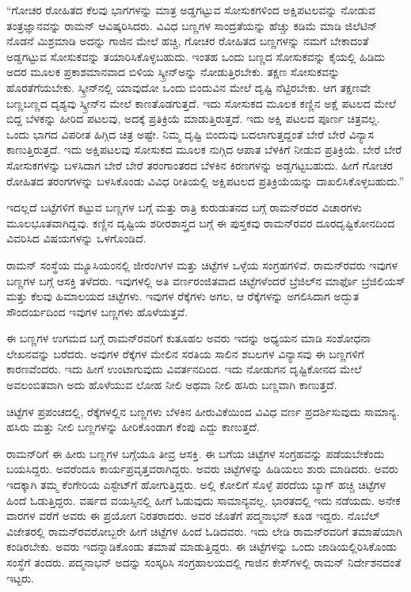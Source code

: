 “ಗೋಚರ ರೋಹಿತದ ಕೆಲವು ಭಾಗಗಳನ್ನು ಮಾತ್ರ ಅಡ್ಡಗಟ್ಟುವ ಸೋಸುಕಗಳಿಂದ ಅಕ್ಷಿಪಟಲವನ್ನು ನೋಡುವ ತಂತ್ರಜ್ಞಾನವನ್ನು ರಾಮನ್ ಆವಿಷ್ಕರಿಸಿದರು. ವಿವಿಧ ಬಣ್ಣಗಳ ಸಾಂದ್ರತೆಯನ್ನು ಹೆಚ್ಚು ಕಡಿಮೆ ಮಾಡಿ ಜಿಲೆಟಿನ್ ನೊಡನೆ ಮಿಶ್ರಮಾಡಿ ಅದನ್ನು ಗಾಜಿನ ಮೇಲೆ ಹಚ್ಚಿ, ಗೋಚರ ರೋಹಿತದ ಬಣ್ಣಗಳನ್ನು ನಮಗೆ ಬೇಕಾದಂತೆ ಅಡ್ಡಗಟ್ಟುವ ಸೋಸುಕವನ್ನು ತಯಾರಿಸಿಕೊಳ್ಳಬಹುದು. ಇಂತಹ ಒಂದು ಬಣ್ಣದ ಸೋಸುಕವನ್ನು ಕೈಯಲ್ಲಿ ಹಿಡಿದು ಅದರ ಮೂಲಕ ಪ್ರಕಾಶಮಾನವಾದ ಬಿಳಿಯ ಸ್ಕ್ರೀನ್‍ಅನ್ನು ನೋಡುತ್ತಿರಬೇಕು. ತಕ್ಷಣ ಸೋಸುಕವನ್ನು ಹೊರತೆಗೆಯಬೇಕು. ಸ್ಕ್ರೀನ್‍ನಲ್ಲಿ ಯಾವುದೋ ಒಂದು ಬಿಂದುವಿನ ಮೇಲೆ ದೃಷ್ಟಿ ನೆಟ್ಟಿರಬೇಕು. ಆಗ ತಕ್ಷಣವೇ ಬಣ್ಣಬಣ್ಣದ ದೃಶ್ಯವು ಸ್ಕ್ರೀನ್‍ನ ಮೇಲೆ ಕಾಣತೊಡಗುತ್ತದೆ. ಇದು ಸೋಸುಕದ ಮೂಲಕ ಕಣ್ಣಿನ ಅಕ್ಷೆ ಪಟಲದ ಮೇಲೆ ಬಿದ್ದ ಬೆಳಕನ್ನು ಹೀರಿದ ಪಟಲವು, ಅದಕ್ಕೆ ಪ್ರತಿಕ್ರಿಯೆ ಮಾಡುತ್ತಿರುತ್ತದೆ. ಇದು ಅಕ್ಷಿ ಪಟಲದ ಪೂರ್ಣ ಚಿತ್ರವಲ್ಲ. ಒಂದು ಭಾಗದ ವಿಪರೀತ ಹಿಗ್ಗಿದ ಚಿತ್ರ ಅಷ್ಟೇ. ನಿಮ್ಮ ದೃಷ್ಟಿ ಬಿಂದುವು ಬದಲಾಗುತ್ತದ್ದಂತೆ ಬೇರೆ ಬೇರೆ ವಿನ್ಯಾಸ ಕಾಣುತ್ತಿರುತ್ತದೆ. ಇದು ಅಕ್ಷಿಪಟಲವು ಸೋಸುಕದ ಮೂಲಕ ನುಗ್ಗಿದ ಆಪಾತ ಬೆಳಕಿಗೆ ನೀಡುವ ಪ್ರತಿಕ್ರಿಯೆ. ಬೇರೆ ಬೇರೆ ಸೋಸುಕಗಳನ್ನು ಬಳಸಿದಾಗ ಬೇರೆ ಬೇರೆ ತರಂಗಾಂತರದ ಬೆಳಕಿನ ಕಿರಣಗಳನ್ನು ಅಡ್ಡಗಟ್ಟಬಹುದು. ಹೀಗೆ ಗೋಚರ ರೋಹಿತದ ತರಂಗಗಳನ್ನು ಬಳಸಿಕೊಂಡು ವಿವಿಧ ರೀತಿಯಲ್ಲಿ ಅಕ್ಷಿಪಟಲದ ಪ್ರತಿಕ್ರಿಯೆಯನ್ನು ದಾಖಲಿಸಿಕೊಳ್ಳಬಹುದು.”

ಇದಲ್ಲದೆ ಬಟ್ಟೆಗಳಿಗೆ ಕಟ್ಟುವ ಬಣ್ಣಗಳ ಬಗ್ಗೆ ಮತ್ತು ರಾತ್ರಿ ಕುರುಡುತನದ ಬಗ್ಗೆ ರಾಮನ್‍ರವರ ವಿಚಾರಗಳು ಮೂಲಭೂತವಾಗಿದ್ದವು. ಕಣ್ಣಿನ ದೃಷ್ಟಿಯ ಶರೀರಶಾಸ್ತ್ರದ ಬಗ್ಗೆ ಈ ಪುಸ್ತಕವು ರಾಮನ್‍ರವರ ದೂರದೃಷ್ಟಿಕೋನದಿಂದ ವಿವರಿಸಿದ ವಿಷಯಗಳನ್ನು ಒಳಗೊಂಡಿದೆ.



ರಾಮನ್ ಸಂಸ್ಥೆಯ ಮ್ಯೂಸಿಯಂನಲ್ಲಿ ಜೀರಂಗಿಗಳ ಮತ್ತು ಚಿಟ್ಟೆಗಳ ಒಳ್ಳೆಯ ಸಂಗ್ರಹಗಳಿವೆ. ರಾಮನ್‍ರವರು ಇವುಗಳ ಬಣ್ಣಗಳ ಬಗ್ಗೆ ಆಸಕ್ತಿ ತಳೆದರು. ಇವುಗಳಲ್ಲಿ ಅತಿ ವರ್ಣರಂಜಿತವಾದ ಚಿಟ್ಟೆಗಳೆಂದರೆ ಬ್ರೆಜಿಲ್‍ನ ಮಾರ್ಫೊ ಬ್ರೆಜಿಲಿಯಸ್ ಮತ್ತು ಕೆಲವು ಹಿಮಾಲಯದ ಚಿಟ್ಟೆಗಳು. ಇವುಗಳ ರೆಕ್ಕೆಗಳು ಅಗಲ, ಆ ರೆಕ್ಕೆಗಳನ್ನು ಅಗಲಿಸಿದಾಗ ಅದ್ಭುತ ಸೌಂದರ್ಯದಿಂದ ಇವುಗಳ ಬಣ್ಣಗಳು ಹೊಳೆಯತ್ತವೆ.

ಈ ಬಣ್ಣಗಳ ಉಗಮದ ಬಗ್ಗೆ ರಾಮನ್‍ರವರಿಗೆ ಕುತೂಹಲ ಅವರು ಇದನ್ನು ಅಧ್ಯಯನ ಮಾಡಿ ಸಂಶೋಧನಾ ಲೇಖನವನ್ನು ಬರೆದರು. ಅವುಗಳ ರೆಕ್ಕೆಗಳ ಮೇಲಿನ ಸರತಿಯ ಸಾಲಿನ ಶಬಲಗಳ ವಿನ್ಯಾಸವು ಈ ಬಣ್ಣಗಳಿಗೆ ಕಾರಣವೆಂದರು. ಇದು ಹೀಗೆ ಉಂಟಾಗುವುದು ವಿವರ್ತನದಿಂದ. ಇದು ನೋಡುಗನ ದೃಷ್ಟಿಕೋನದ ಮೇಲೆ ಅವಲಂಬಿತವಾಗಿ ಅದು ಹೊಳೆಯುವ ಲೋಹ ನೀಲಿ ಅಥವಾ ನೀಲಿ ಹಸಿರು ಬಣ್ಣವಾಗಿ ಕಾಣುತ್ತದೆ.

ಚಿಟ್ಟೆಗಳ ಪ್ರಪಂಚದಲ್ಲಿ, ರೆಕ್ಕೆಗಳಲ್ಲಿನ ಬಣ್ಣಗಳು ಬೆಳಕಿನ ಹೀರುವಿಕೆಯಿಂದ ವಿವಿಧ ವರ್ಣ ಪ್ರದರ್ಶಿಸುವುದು ಸಾಮಾನ್ಯ. ಹಸಿರು ಮತ್ತು ನೀಲಿ ಬಣ್ಣಗಳನ್ನು ಹೀರಿಕೊಂಡಾಗ ಕೆಂಪು ಎದ್ದು ಕಾಣುತ್ತದೆ.

ರಾಮನ್‍ರಿಗೆ ಈ ಹೀರು ಬಣ್ಣಗಳ ಬಗ್ಗೆಯೂ ತೀವ್ರ ಆಸಕ್ತಿ. ಈ ಬಗೆಯ ಚಿಟ್ಟೆಗಳ ಸಂಗ್ರಹವನ್ನು ಪಡೆಯಬೇಕೆಂದು ಬಯಸಿದ್ದರು. ಅವರೆಂದೂ ಕಾರ್ಯಪ್ರವೃತ್ತವರಾಗಿದ್ದರು. ಅವರು ಚಿಟ್ಟೆಗಳನ್ನು ಹಿಡಿಯಲು ಶುರು ಮಾಡಿದರು. ಅವರು ಇದಕ್ಕಾಗಿ ತಮ್ಮ ಕೆಂಗೇರಿಯ ಎಸ್ಟೇಟ್‍ಗೆ ಹೋಗುತ್ತಿದ್ದರು. ಅಲ್ಲಿ ಕೋಲಿಗೆ ಸೊಳ್ಳೆ ಪರದೆಯ ಬ್ಯಾಗ್ ಹಚ್ಚಿ ಚಿಟ್ಟೆಗಳ ಹಿಂದೆ ಓಡುತ್ತಿದ್ದರು.  ವರ್ಷದ ವಯಸ್ಸಿನಲ್ಲಿ ಹೀಗೆ ಓಡುವುದು ಸಾಮಾನ್ಯವಲ್ಲ. ಭಾರತದಲ್ಲಿ ಇದು ನಡೆಯದು. ಅನೇಕ ವಾರಗಳ ವರೆಗೆ ಅವರು ಈ ಪ್ರಯೋಗ ನಿರತರಾದರು. ಅವರ ಜೊತೆಗೆ ಪದ್ಮನಾಭನ್ ಕೂಡ ಇದ್ದರು. ನೊಬೆಲ್ ವಿಜೇತರಲ್ಲಿ ರಾಮನ್‍ರವರೋಬ್ಬರೇ ಹೀಗೆ ಚಿಟ್ಟೆಗಳ ಹಿಂದೆ ಓಡಿದವರು. ಇದು ಲೇಡಿ ರಾಮನ್‍ರವರಿಗೆ ತಮಾಷೆಯಾಗಿ ಕಂಡಿರಬೇಕು. ಅವರು ಇದನ್ನಾಡಿಕೊಂಡು ತಮಾಷೆ ಮಾಡುತ್ತಿದ್ದರು. ಈ ಚಿಟ್ಟೆಗಳನ್ನು ಒಂದು ಜಾಡಿಯಲ್ಲಿರಿಸಿಕೊಂಡು ಸಂಸ್ಥೆಗೆ ತಂದರು. ಪದ್ಮನಾಭನ್ ಅದನ್ನು ಸಂಸ್ಕರಿಸಿ ಸಂಗ್ರಹಾಲಯದಲ್ಲಿ ಗಾಜಿನ ಕೇಸ್‍ಗಳಲ್ಲಿ ರಾಮನ್ ನಿರ್ದೇಶನದಂತೆ ಇಟ್ಟರು.


